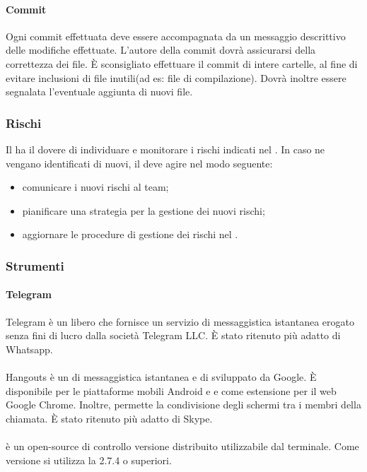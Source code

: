  \paragraph{Commit}
 Ogni commit effettuata deve essere accompagnata da un messaggio descrittivo delle modifiche effettuate. L'autore della commit dovrà assicurarsi della correttezza dei file. È sconsigliato effettuare il commit di intere cartelle, al fine di evitare inclusioni di file inutili(ad es: file di compilazione).
 Dovrà inoltre essere segnalata l'eventuale aggiunta di nuovi file.
 \subsubsection{Rischi}
 Il \RESP{} ha il dovere di individuare e monitorare i rischi indicati nel \PPdoc. In caso ne vengano identificati di nuovi, il \RESP{} deve agire nel modo seguente:
 \begin{itemize}
  \item comunicare i nuovi rischi al team;
  \item pianificare una strategia per la gestione dei nuovi rischi;
  \item aggiornare le procedure di gestione dei rischi nel \PPdoc.
 \end{itemize}
\subsubsection{Strumenti}
 \paragraph{Telegram}
 Telegram è un  libero che fornisce un servizio di messaggistica istantanea erogato senza fini di lucro dalla società Telegram LLC. È stato ritenuto più adatto di Whatsapp.
 \paragraph{}
 Hangouts è un  di messaggistica istantanea e di    sviluppato da Google. È disponibile per le piattaforme mobili Android e  e come estensione per il  web Google Chrome. Inoltre, permette la condivisione degli schermi tra i membri della chiamata. È stato ritenuto più adatto di Skype.
 \paragraph{}
  è un  open-source di controllo versione distribuito utilizzabile dal terminale. Come versione si utilizza la 2.7.4 o superiori.
